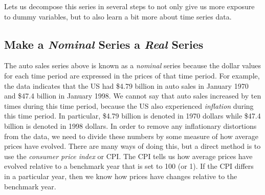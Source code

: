 \documentclass[
]{book}
\begin{document}
Lets us decompose this series in several steps to not only give us more exposure to dummy variables, but to also learn a bit more about time series data.

\hypertarget{make-a-nominal-series-a-real-series}{%
\subsection*{\texorpdfstring{Make a \emph{Nominal} Series a \emph{Real} Series}{Make a Nominal Series a Real Series}}\label{make-a-nominal-series-a-real-series}}

The auto sales series above is known as a \emph{nominal} series because the dollar values for each time period are expressed in the prices of that time period. For example, the data indicates that the US had \$4.79 billion in auto sales in January 1970 and \$47.4 billion in January 1998. We cannot say that auto sales increased by ten times during this time period, because the US also experienced \emph{inflation} during this time period. In particular, \$4.79 billion is denoted in 1970 dollars while \$47.4 billion is denoted in 1998 dollars. In order to remove any inflationary distortions from the data, we need to divide these numbers by some measure of how average prices have evolved. There are many ways of doing this, but a direct method is to use the \emph{consumer price index} or CPI. The CPI tells us how average prices have evolved relative to a benchmark year that is set to 100 (or 1). If the CPI differs in a particular year, then we know how prices have changes relative to the benchmark year.
\end{document}
